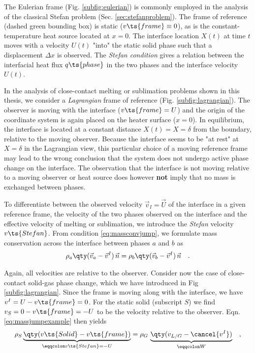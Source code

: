 The Eulerian frame (Fig. \ref{subfig:eulerian}) is commonly employed in the analysis of the classical Stefan problem (Sec. \ref{sec:stefanproblem}). The frame of reference (dashed green bounding box) is static ($v\ts{frame}\equiv 0$), as is the constant-temperature heat source located at $x=0$. The interface location $X(t)$ at time $t$ moves with a velocity $U(t)$ "into" the static solid phase such that a displacement $\Delta x$ is observed. The \textit{Stefan condition} gives a relation between the interfacial heat flux $q\ts{phase}$ in the two phases and the interface velocity $U(t)$.

In the analysis of close-contact melting or sublimation problems shown in this thesis, we consider a \textit{Lagrangian} frame of reference (Fig. \ref{subfig:lagrangian}). The observer is moving with the interface ($v\ts{frame}=U$) and the origin of the coordinate system is again placed on the heater surface ($x=0$). In equilibrium, the interface is located at a constant distance $X(t)=X=\delta$ from the boundary, relative to the moving observer. 
Because the interface seems to be "at rest" at $X=\delta$ in the Lagrangian view, this particular choice of a moving reference frame may lead to the wrong conclusion that the system does not undergo active phase change on the interface. The observation that the interface is not moving relative to a moving observer or heat source does however \textbf{not} imply that no mass is exchanged between phases.

To differentiate between the observed velocity $\Vec{v}_I=\Vec{U}$ of the interface in a given reference frame, the velocity of the two phases observed on the interface and the effective velocity of melting or sublimation, we introduce the \textit{Stefan} velocity $v\ts{Stefan}$. From condition \ref{eq:massconvjump}, we formulate mass conservation across the interface between phases $a$ and $b$ as
\begin{equation}\label{eq:massjumpexample}
    \rho_a\qty(\Vec{v}_a-\Vec{v}^I)\,\Vec{n} = \rho_b\qty(\Vec{v}_b-\Vec{v}^I)\,\Vec{n}\quad . 
\end{equation}

Again, all velocities are relative to the observer. Consider now the case of close-contact solid-gas phase change, which we have introduced in Fig \ref{subfig:lagrangian}. Since the frame is moving along with the interface, we have $v^I = U-v\ts{frame}=0$. For the static solid (subscript $S$) we find $v_S= 0 - v\ts{frame} = -U$ to be the velocity relative to the observer. Eqn. \ref{eq:massjumpexample} then yields
\begin{equation}\label{eq:massjumpgassolid}
    \rho_S\underbrace{\qty(v\ts{Solid}-v\ts{frame})}_{\eqqcolon v\ts{Stefan} = -U} = \rho_G\,\underbrace{\qty(v_{L/G}-\cancel{v^I})}_{\eqqcolon W} \quad ,  
\end{equation}

